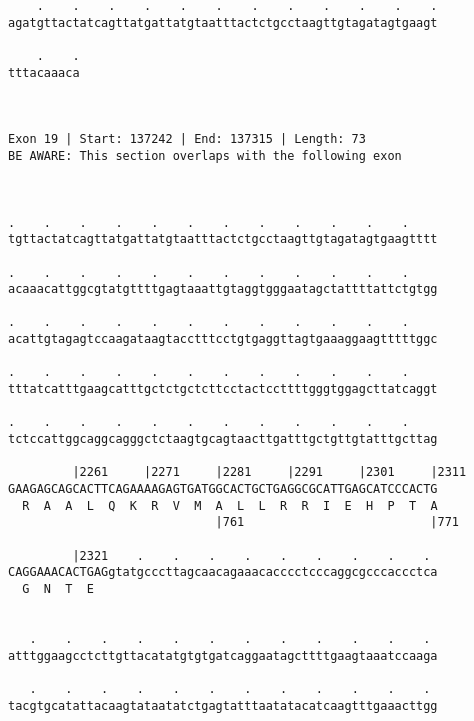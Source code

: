\documentclass{article}
\begin{document}
\begin{Verbatim}
    .    .    .    .    .    .    .    .    .    .    .    .
agatgttactatcagttatgattatgtaatttactctgcctaagttgtagatagtgaagt
                                                            
    .    .
tttacaaaca
          
          
 
Exon 19 | Start: 137242 | End: 137315 | Length: 73
BE AWARE: This section overlaps with the following exon



.    .    .    .    .    .    .    .    .    .    .    .    
tgttactatcagttatgattatgtaatttactctgcctaagttgtagatagtgaagtttt
                                                            
.    .    .    .    .    .    .    .    .    .    .    .    
acaaacattggcgtatgttttgagtaaattgtaggtgggaatagctattttattctgtgg
                                                            
.    .    .    .    .    .    .    .    .    .    .    .    
acattgtagagtccaagataagtacctttcctgtgaggttagtgaaaggaagtttttggc
                                                            
.    .    .    .    .    .    .    .    .    .    .    .    
tttatcatttgaagcatttgctctgctcttcctactccttttgggtggagcttatcaggt
                                                            
.    .    .    .    .    .    .    .    .    .    .    .    
tctccattggcaggcagggctctaagtgcagtaacttgatttgctgttgtatttgcttag
                                                            
         |2261     |2271     |2281     |2291     |2301     |2311
GAAGAGCAGCACTTCAGAAAAGAGTGATGGCACTGCTGAGGCGCATTGAGCATCCCACTG
  R  A  A  L  Q  K  R  V  M  A  L  L  R  R  I  E  H  P  T  A
                             |761                          |771
  
         |2321    .    .    .    .    .    .    .    .    . 
CAGGAAACACTGAGgtatgcccttagcaacagaaacacccctcccaggcgcccaccctca
  G  N  T  E                                                
                                                            
  
   .    .    .    .    .    .    .    .    .    .    .    . 
atttggaagcctcttgttacatatgtgtgatcaggaatagcttttgaagtaaatccaaga
                                                            
   .    .    .    .    .    .    .    .    .    .    .    . 
tacgtgcatattacaagtataatatctgagtatttaatatacatcaagtttgaaacttgg
                                                            

\end{Verbatim}
\end{document}
